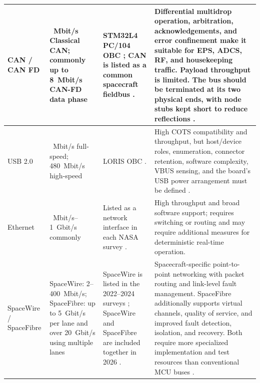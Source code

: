 \documentclass[10pt]{../datasheet}
\let\cite\citep
\begin{document}
\begin{longtable}{|
  >{\raggedright\arraybackslash}p{2.5cm}|
  >{\raggedright\arraybackslash}p{2.5cm}|
  >{\raggedright\arraybackslash}p{5.0cm}|
  >{\raggedright\arraybackslash}p{5.2cm}|}
  CAN / CAN FD                                                         &
  1~Mbit/s Classical CAN; commonly up to 8~Mbit/s CAN-FD data phase    &
  STM32L4 PC/104 OBC \cite{stm32l4_vst104_pub}; CAN is listed as a common
  spacecraft fieldbus
  \cite[p.~219]{nasa_soa_2022}
  \cite[p.~235]{nasa_soa_2023}
  \cite[p.~240]{nasa_soa_2024}
  \cite[pp.~224--225]{nasa_soa_2026}.                                  &
  Differential multidrop operation, arbitration, acknowledgements, and error
  confinement make it suitable for EPS, ADCS, RF, and housekeeping traffic.
  Payload throughput is limited. The bus should be terminated at its two
  physical ends, with node stubs kept short to reduce reflections
  \cite{ti_can_phy,ecss_canbus}.                                                             \\ \hline

  USB 2.0                                                              &
  12~Mbit/s full-speed; 480~Mbit/s high-speed                          &
  LORIS OBC \cite{loris_obc_pub}.                                      &
  High COTS compatibility and throughput, but host/device roles, enumeration,
  connector retention, software complexity, VBUS sensing, and the board's USB
  power arrangement must be defined \cite{usb20_spec,st_an4879}.                             \\ \hline

  Ethernet                                                             &
  100~Mbit/s--1~Gbit/s commonly                                        &
  Listed as a network interface in each NASA survey
  \cite[p.~219]{nasa_soa_2022}
  \cite[p.~235]{nasa_soa_2023}
  \cite[p.~240]{nasa_soa_2024}
  \cite[p.~224]{nasa_soa_2026}.                                        &
  High throughput and broad software support; requires switching or routing and
  may require additional measures for deterministic real-time operation.
  \\ \hline

  SpaceWire / SpaceFibre                                               &
  SpaceWire: 2--400~Mbit/s;
  SpaceFibre: up to 5~Gbit/s per lane and over 20~Gbit/s using
  multiple lanes \cite{ecss_spacewire,ecss_spacefibre}                 &
  SpaceWire is listed in the 2022--2024 surveys
  \cite[p.~219]{nasa_soa_2022}
  \cite[p.~235]{nasa_soa_2023}
  \cite[p.~240]{nasa_soa_2024};
  SpaceWire and SpaceFibre are included together in 2026
  \cite[p.~225]{nasa_soa_2026}.                                        &
  Spacecraft-specific point-to-point networking with packet routing and
  link-level fault management. SpaceFibre additionally supports virtual
  channels, quality of service, and improved fault detection, isolation, and
  recovery. Both require more specialized implementation and test resources
  than conventional MCU buses \cite{ecss_spacewire,ecss_spacefibre}.                         \\ \hline


\end{longtable}
\end{document}
